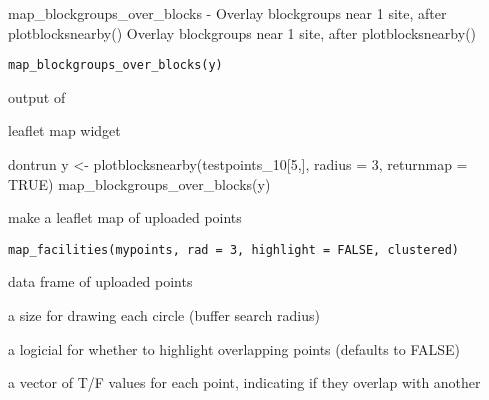 \documentclass[a4paper]{book}
\begin{document}
%
\begin{Description}\relax
map\_blockgroups\_over\_blocks - Overlay blockgroups near 1 site, after plotblocksnearby()
Overlay blockgroups near 1 site, after plotblocksnearby()
\end{Description}
%
\begin{Usage}
\begin{verbatim}
map_blockgroups_over_blocks(y)
\end{verbatim}
\end{Usage}
%
\begin{Arguments}
\begin{ldescription}
\item[\code{y}] output of 
\end{ldescription}
\end{Arguments}
%
\begin{Value}
leaflet map widget
\end{Value}
%
\begin{SeeAlso}\relax
{}
\end{SeeAlso}
%
\begin{Examples}
\begin{ExampleCode}
dontrun{
 y <- plotblocksnearby(testpoints_10[5,], 
        radius = 3,
        returnmap = TRUE)
 map_blockgroups_over_blocks(y)
  }
\end{ExampleCode}
\end{Examples}
%
\begin{Description}\relax
make a leaflet map of uploaded points
\end{Description}
%
\begin{Usage}
\begin{verbatim}
map_facilities(mypoints, rad = 3, highlight = FALSE, clustered)
\end{verbatim}
\end{Usage}
%
\begin{Arguments}
\begin{ldescription}
\item[\code{mypoints, }] data frame of uploaded points

\item[\code{rad, }] a size for drawing each circle (buffer search radius)

\item[\code{highlight, }] a logicial for whether to highlight overlapping points (defaults to FALSE)

\item[\code{clustered, }] a vector of T/F values for each point, indicating if they overlap with another
\end{ldescription}
\end{Arguments}
\end{document}
